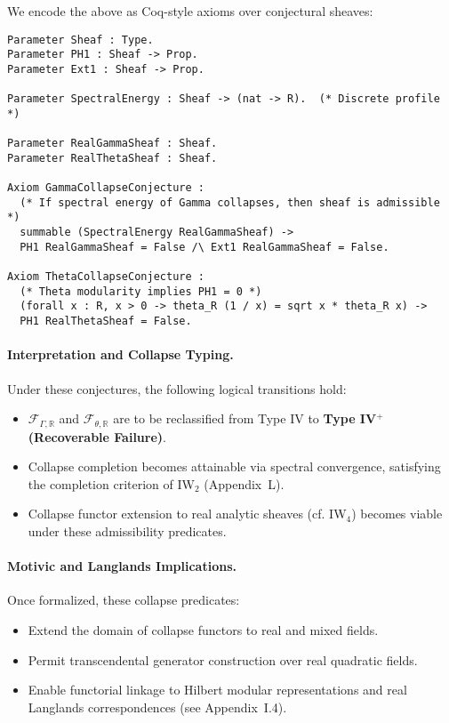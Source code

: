 \documentclass[11pt]{article}
\begin{document}
We encode the above as Coq-style axioms over conjectural sheaves:

\begin{lstlisting}[language=Coq, caption={Coq: Real Theta and Gamma Collapse Predicate}]
Parameter Sheaf : Type.
Parameter PH1 : Sheaf -> Prop.
Parameter Ext1 : Sheaf -> Prop.

Parameter SpectralEnergy : Sheaf -> (nat -> R).  (* Discrete profile *)

Parameter RealGammaSheaf : Sheaf.
Parameter RealThetaSheaf : Sheaf.

Axiom GammaCollapseConjecture :
  (* If spectral energy of Gamma collapses, then sheaf is admissible *)
  summable (SpectralEnergy RealGammaSheaf) ->
  PH1 RealGammaSheaf = False /\ Ext1 RealGammaSheaf = False.

Axiom ThetaCollapseConjecture :
  (* Theta modularity implies PH1 = 0 *)
  (forall x : R, x > 0 -> theta_R (1 / x) = sqrt x * theta_R x) ->
  PH1 RealThetaSheaf = False.
\end{lstlisting}

\paragraph{Interpretation and Collapse Typing.}

Under these conjectures, the following logical transitions hold:
\begin{itemize}
  \item \( \mathcal{F}_{\Gamma,\mathbb{R}} \) and \( \mathcal{F}_{\theta,\mathbb{R}} \) are to be reclassified from Type IV to \textbf{Type IV$^+$ (Recoverable Failure)}.
  \item Collapse completion becomes attainable via spectral convergence, satisfying the completion criterion of IW$_2$ (Appendix~L).
  \item Collapse functor extension to real analytic sheaves (cf. IW$_4$) becomes viable under these admissibility predicates.
\end{itemize}


\paragraph{Motivic and Langlands Implications.}

Once formalized, these collapse predicates:
\begin{itemize}
  \item Extend the domain of collapse functors to real and mixed fields.
  \item Permit transcendental generator construction over real quadratic fields.
  \item Enable functorial linkage to Hilbert modular representations and real Langlands correspondences (see Appendix~I.4).
\end{itemize}
\end{document}

